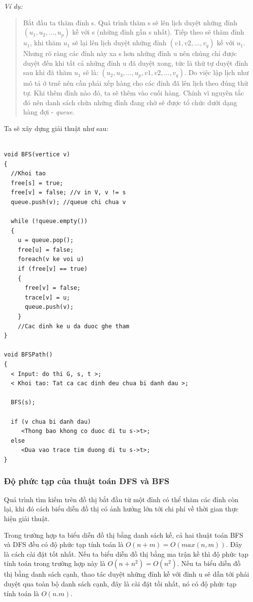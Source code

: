 \documentclass[a4paper,10pt]{article}
\begin{document}
\emph{Ví dụ: }
\begin{quotation}
  Bắt đầu ta thăm đỉnh s. Quá trình thăm s sẽ lên lịch duyệt những đỉnh $(u_1, u_2, \ldots , u_p)$ kề với s (những đỉnh gần s nhất). Tiếp theo sẽ thăm đỉnh $u_1$, khi thăm $u_1$ sẽ lại lên lịch duyệt những đỉnh $(v1, v2, \ldots , v_q)$ kề với $u_1$. Nhưng rõ ràng các đỉnh này xa s hơn những đỉnh u nên chúng chỉ được duyệt đến khi tất cả những đỉnh u đã duyệt xong, tức là thứ tự duyệt đỉnh sau khi đã thăm $u_1$ sẽ là: $(u_2, u_3, \ldots , u_p, v1, v2, \ldots , v_q )$. Do việc lập lịch như mô tả ở trnê nên cần phải xếp hàng cho các đỉnh đã lên lịch theo đúng thứ tự. Khi thêm đỉnh nào đó, ta sẽ thêm vào cuối hàng. Chính vì nguyên tắc đó nên danh sách chứa những đỉnh đang chờ sẽ được tổ chức dưới dạng hàng đợi - \emph{queue}.
\end{quotation}
Ta sẽ xây dựng giải thuật như sau:
\begin{verbatim}

void BFS(vertice v)
{
  //Khoi tao
  free[s] = true;
  free[v] = false; //v in V, v != s
  queue.push(v); //queue chi chua v

  while (!queue.empty())
  {
    u = queue.pop();
    free[u] = false;
    foreach(v ke voi u)
    if (free[v] == true)
    {
      free[v] = false;
      trace[v] = u;
      queue.push(v);
    }
    //Cac dinh ke u da duoc ghe tham
}

void BFSPath()
{
  < Input: do thi G, s, t >;
  < Khoi tao: Tat ca cac dinh deu chua bi danh dau >;

  BFS(s);

  if (v chua bi danh dau)
     <Thong bao khong co duoc di tu s->t>;
  else
     <Dua vao trace tim duong di tu s->t>;
}
\end{verbatim}

\subsubsection{Độ phức tạp của thuật toán DFS và BFS}
Quá trình tìm kiếm trên đồ thị bắt đầu từ một đỉnh có thể thăm các đỉnh còn lại, khi đó cách biểu diễn đồ thị có ảnh hưởng lớn tới chi phí về thời gian thực hiện giải thuật.

Trong trường hợp ta biểu diễn đồ thị bằng danh sách kề, cả hai thuật toán BFS và DFS đều có độ phức tạp tính toán là $O(n+m) = O(max(n, m))$. Đây là cách cài đặt tốt nhất. Nếu ta biểu diễn đồ thị bằng ma trận kề thì độ phức tạp tính toán trong trường hợp này là $O(n + n^2) = O(n^2)$. Nếu ta biểu diễn đồ thị bằng danh sách cạnh, thao tác duyệt những đỉnh kề với đỉnh u sẽ dẫn tới phải duyệt qua toàn bộ danh sách cạnh, đây là cài đặt tồi nhất, nó có độ phức tạp tính toán là $O(n.m)$.
\end{document}

